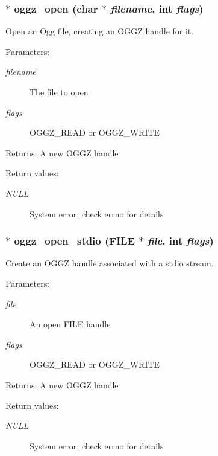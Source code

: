 \subsubsection{$\ast$ oggz\_\-open (char $\ast$ {\em filename}, int {\em flags})}\label{oggz_8h_a5}


Open an Ogg file, creating an OGGZ handle for it. 

\begin{Desc}
\item[Parameters:]
\begin{description}
\item[{\em filename}]The file to open \item[{\em flags}]OGGZ\_\-READ or OGGZ\_\-WRITE \end{description}
\end{Desc}
\begin{Desc}
\item[Returns:]A new OGGZ handle \end{Desc}
\begin{Desc}
\item[Return values:]
\begin{description}
\item[{\em NULL}]System error; check errno for details \end{description}
\end{Desc}
\subsubsection{$\ast$ oggz\_\-open\_\-stdio (FILE $\ast$ {\em file}, int {\em flags})}\label{oggz_8h_a6}


Create an OGGZ handle associated with a stdio stream. 

\begin{Desc}
\item[Parameters:]
\begin{description}
\item[{\em file}]An open FILE handle \item[{\em flags}]OGGZ\_\-READ or OGGZ\_\-WRITE \end{description}
\end{Desc}
\begin{Desc}
\item[Returns:]A new OGGZ handle \end{Desc}
\begin{Desc}
\item[Return values:]
\begin{description}
\item[{\em NULL}]System error; check errno for details \end{description}
\end{Desc}
